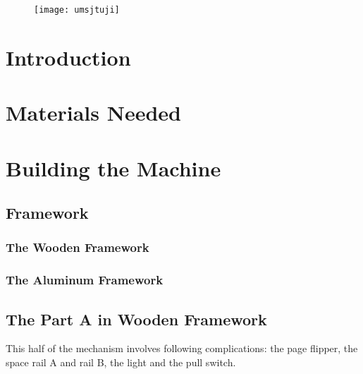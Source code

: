\documentclass[a4paper]{refart}
\title{\tle}
\author{
Group Bluebear\\
Li Songqian\\
Ruan zhihao\\
Wu Yinyue\\
Zhou Ruixing
}
\begin{document}
\maketitle
\begin{figure}[b]
  \raggedleft
  \texttt{[image: umsjtuji]}\\
\end{figure}
\begin{abstract}
        A Rube Goldberg machine is a intentionally over-designed complex device, which involve a series of units or ``complications'' that linked together and then trigger one after another with a simple task finished at the end. Our machine is designed for the study room and for the people who enjoy reading. It is able to switch on the light, flip pages of a book and make tea for the user, with only one trigger to start. This manual will present you all the complications in this machines as well as how to build them.
\end{abstract}

\tableofcontents

\newpage



\section{Introduction}
	
\section{Materials Needed}
\section{Building the Machine}
	\subsection{Framework}
		\subsubsection{The Wooden Framework}
		\subsubsection{The Aluminum Framework}
	\subsection{The Part A in Wooden Framework}
		This half of the mechanism involves following complications: the page flipper, the space rail A and rail B, the light and the pull switch. 
\end{document}
